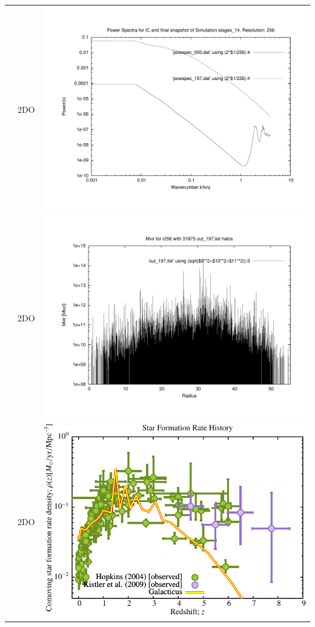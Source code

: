 \documentclass[a4paper,11pt,fleqn,oneside]{book}
\begin{document}
\begin{itemize}
\begin{table}[p]
\begin{tabular}{l|c|c}
 & 2DO & \includegraphics[scale=0.25]{r256/h100/stages_14/plot_powspec_stages_14.pdf} \\
 & 2DO & \includegraphics[scale=0.25]{r256/h100/stages_14/plot_mvir_out_197.pdf} \\
 & 2DO & \includegraphics[scale=0.5]{r256/h100/stages_14/Plot_Star_Formation_History.pdf} \\

\end{tabular}
\end{table}
\end{itemize}
\end{document}
